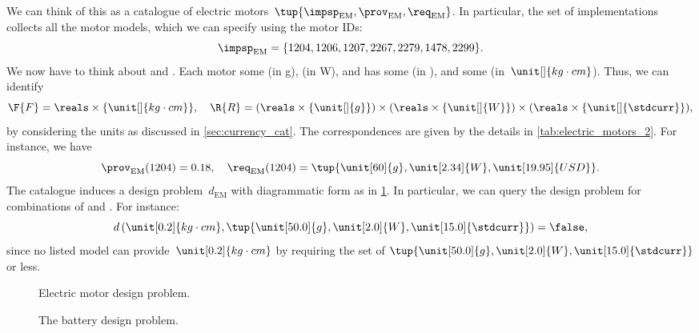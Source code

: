 \begin{example}
  We can think of this as a catalogue of electric motors~$\tup{\impsp_\mathrm{EM},\prov_\mathrm{EM},\req_\mathrm{EM}}$. In particular, the set of implementations collects all the motor models, which we can specify using the motor IDs:
  \begin{equation}
    \impsp_\mathrm{EM}=\{1204,1206,1207,2267,2279,1478,2299 \}.
  \end{equation}
  We now have to think about  and . Each motor  some  (in \unit[]{g}),  (in \unit[]{W}), and has some  (in \stdcurr), and  some  (in~$\unit[]{kg\cdot cm}$). Thus, we can identify
  \begin{equation*}
    \F{F}=\reals\times \{\unit[]{kg\cdot cm}\},\quad \R{R}=(\reals\times \{\unit[]{g}\})\times (\reals\times \{\unit[]{W}\})\times (\reals\times \{\unit[]{\stdcurr}\}),
  \end{equation*}
  by considering the units as discussed in \cref{sec:currency_cat}. The correspondences are given by the details in \cref{tab:electric_motors_2}. For instance, we have
  \begin{equation}
    \prov_\mathrm{EM}(1204)=0.18, \quad \req_\mathrm{EM}(1204)=\tup{\unit[60]{g},\unit[2.34]{W},\unit[19.95]{USD}}.
  \end{equation}
  The catalogue induces a design problem~$d_\mathrm{EM}$ with diagrammatic form as in \cref{fig:dp_em}. In particular, we can query the design problem for combinations of  and . For instance:
  \begin{equation}
    d\left(\unit[0.2]{kg\cdot cm}, \tup{\unit[50.0]{g},\unit[2.0]{W},\unit[15.0]{\stdcurr}} \right)=\false,
  \end{equation}
  since no listed model can provide~$\unit[0.2]{kg\cdot cm}$  by requiring the set of  $\tup{\unit[50.0]{g},\unit[2.0]{W},\unit[15.0]{\stdcurr}}$ or less.

  \begin{figure}[tbh]
    \begin{center}
    \end{center}
    \caption{Electric motor design problem.}\label{fig:dp_em}
  \end{figure}

  \begin{figure}[tbh]
    \begin{center}
    \end{center}
    \caption{The battery design problem.}
    \label{fig:dp_battery}
  \end{figure}


\end{example}
